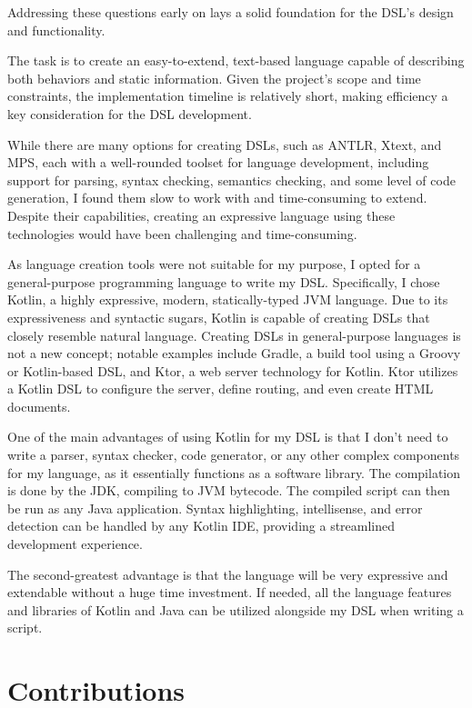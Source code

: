Addressing these questions early on lays a solid foundation for the DSL's design and functionality.

The task is to create an easy-to-extend, text-based language capable of describing both behaviors and static information. Given the project's scope and time constraints, the implementation timeline is relatively short, making efficiency a key consideration for the DSL development.

While there are many options for creating DSLs, such as ANTLR, Xtext, and MPS, each with a well-rounded toolset for language development, including support for parsing, syntax checking, semantics checking, and some level of code generation, I found them slow to work with and time-consuming to extend. Despite their capabilities, creating an expressive language using these technologies would have been challenging and time-consuming.

As language creation tools were not suitable for my purpose, I opted for a general-purpose programming language to write my DSL. Specifically, I chose Kotlin, a highly expressive, modern, statically-typed JVM language. Due to its expressiveness and syntactic sugars, Kotlin is capable of creating DSLs that closely resemble natural language. Creating DSLs in general-purpose languages is not a new concept; notable examples include Gradle, a build tool using a Groovy or Kotlin-based DSL, and Ktor, a web server technology for Kotlin. Ktor utilizes a Kotlin DSL to configure the server, define routing, and even create HTML documents.

One of the main advantages of using Kotlin for my DSL is that I don't need to write a parser, syntax checker, code generator, or any other complex components for my language, as it essentially functions as a software library. The compilation is done by the JDK, compiling to JVM bytecode. The compiled script can then be run as any Java application. Syntax highlighting, intellisense, and error detection can be handled by any Kotlin IDE, providing a streamlined development experience.

The second-greatest advantage is that the language will be very expressive and extendable without a huge time investment. If needed, all the language features and libraries of Kotlin and Java can be utilized alongside my DSL when writing a script.

\section{Contributions}

